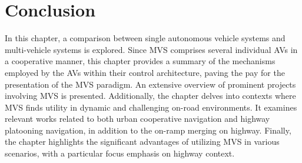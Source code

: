  

 
 
 
 
 
 
 
 
 
 
 
 
 
 
 
 
 








\section{Conclusion}




In this chapter, a comparison between single autonomous vehicle systems and multi-vehicle systems is explored. Since MVS comprises several individual AVs in a cooperative manner, this chapter provides a summary of the mechanisms employed by the AVs within their control architecture, paving the pay for the presentation of the MVS paradigm. An extensive overview of prominent projects involving MVS is presented. Additionally, the chapter delves into contexts where MVS finds utility in dynamic and challenging on-road environments. It examines relevant works related to both urban cooperative navigation and highway platooning navigation, in addition to the on-ramp merging on highway. Finally, the chapter highlights the significant advantages of utilizing MVS in various scenarios, with a particular focus emphasis on highway context. 
 
